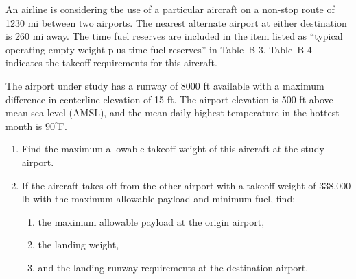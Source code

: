 \documentclass{KPS_assignment}
\begin{document}
An airline is considering the use of a particular aircraft on a non-stop route of 1230 mi between two airports. The nearest alternate airport at either destination is 260 mi away. The time fuel reserves are included in the item listed as ``typical operating empty weight plus time fuel reserves'' in Table~B-3. Table~B-4 indicates the takeoff requirements for this aircraft.

The airport under study has a runway of 8000 ft available with a maximum difference in centerline elevation of 15 ft. The airport elevation is 500 ft above mean sea level (AMSL), and the mean daily highest temperature in the hottest month is $90^\circ$F.

\begin{enumerate}
    \item[(a)] Find the maximum allowable takeoff weight of this aircraft at the study airport.

    \item[(b)] If the aircraft takes off from the other airport with a takeoff weight of 338{,}000 lb with the maximum allowable payload and minimum fuel, find:
    \begin{enumerate}
        \item the maximum allowable payload at the origin airport,
        \item the landing weight,
        \item and the landing runway requirements at the destination airport.
    \end{enumerate}
\end{enumerate}

\bigskip
\end{document}
